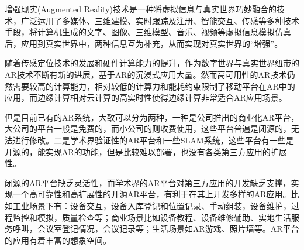 \cleardoublepage
{}
增强现实(Augmented Reality)技术是一种将虚拟信息与真实世界巧妙融合的技术，广泛运用了多媒体、三维建模、实时跟踪及注册、智能交互、传感等多种技术手段，将计算机生成的文字、图像、三维模型、音乐、视频等虚拟信息模拟仿真后，应用到真实世界中，两种信息互为补充，从而实现对真实世界的“增强”。

随着传感定位技术的发展和硬件计算能力的提升，作为数字世界与真实世界纽带的AR技术不断有新的进展，基于AR的沉浸式应用大量。然而高可用性的AR技术仍然需要较高的计算能力，相对较低的计算力和能耗约束限制了移动平台在AR中的应用，而边缘计算相对云计算的高实时性使得边缘计算非常适合AR应用场景。

但是目前已有的AR系统，大致可以分为两种，一种是公司推出的商业化AR平台，大公司的平台一般是免费的，而小公司的则收费使用，这些平台普遍是闭源的，无法进行修改。二是学术界验证性的AR平台和一些SLAM系统，这些平台有一些是开源的，能实现AR的功能，但是比较难以部署，也没有各类第三方应用的扩展性。

闭源的AR平台缺乏灵活性，而学术界的AR平台对第三方应用的开发缺乏支撑，实现一个高可靠性和高扩展性的开源AR平台，有利于在其上开发多样的AR应用。比如工业场景下有：设备交互，设备入库登记和位置记录、手动组装，设备维护，过程监控和模拟，质量检查等；商业场景比如设备教程、设备维修辅助、实地生活服务呼叫，会议室登记情况，会议记录等；生活场景如AR游戏、照片墙等。AR平台的应用有着丰富的想象空间。
